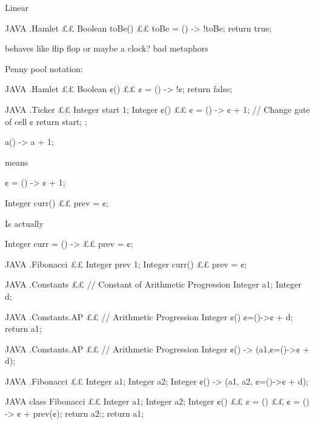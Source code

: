 Linear 
\begin{code}{JAVA}
.Hamlet {££
  Boolean toBe() {££ 
    toBe = () -> !toBe; 
    return true; 
  }
}
\end{code}
behaves like flip flop or maybe a clock? bad metaphors


Penny pool notation:
\begin{code}{JAVA}
.Hamlet {££
  Boolean ¢() {££ ¢ = () -> !¢; return false; }
}
\end{code}

\begin{code}{JAVA}
.Ticker {££ 
  Integer start 1;
  Integer ¢() {££
      ¢ = () -> ¢ + 1; // Change gate of cell ¢
      return start;
  };
}
\end{code}

\begin{java}
   a() -> a + 1;
\end{java}
    means
\begin{java}
  ¢ = () -> ¢ + 1;
\end{java}

\begin{java}
  Integer curr() {££ prev = ¢;}
\end{java}
Is actually
\begin{java}
  Integer curr = () -> {££ prev = ¢;}
\end{java}

\begin{code}{JAVA}
.Fibonacci {££
  Integer prev 1;
  Integer curr() {££ prev = ¢;}
}
\end{code}

\begin{code}{JAVA}
.Constants {££ // Constant of Arithmetic Progression
  Integer a1;
  Integer d;
}
\end{code}

\begin{code}{JAVA}
.Constants.AP {££ // Arithmetic Progression
  Integer ¢() {¢=()->¢ + d; return a1;}
}
\end{code}

\begin{code}{JAVA}
.Constants.AP {££ // Arithmetic Progression
  Integer ¢() -> (a1,¢=()->¢ + d); 
}
\end{code}

\begin{code}{JAVA}
.Fibonacci {££ 
  Integer a1;
  Integer a2;
  Integer ¢() -> (a1, a2, ¢=()->¢ + d); 
}
\end{code}

\begin{code}{JAVA}
class Fibonacci {££ 
  Integer a1;
  Integer a2;
  Integer ¢() {££
    ¢ = () {££ ¢ = () -> ¢ + prev(¢); return a2;};
    return a1;
  }
}
\end{code}


